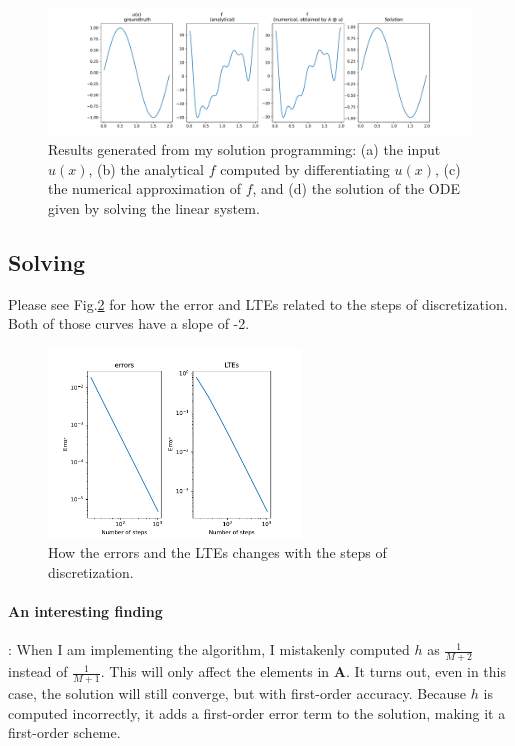 \documentclass[12pt, fullpage,letterpaper]{article}
\begin{document}
\begin{figure}[H]
    \centering
    \includegraphics[width=1\textwidth]{Problem1/solution.pdf}
    \caption{Results generated from my solution programming: (a) the input $u(x)$, (b) the analytical $f$ computed by differentiating $u(x)$, (c) the numerical approximation of $f$, and (d) the solution of the ODE given by solving the linear system. }
    \label{fig:solution}
\end{figure}
\subsection{Solving}
Please see Fig.\ref{fig:error} for how the error and LTEs related to the steps of discretization. Both of those curves have a slope of -2.
\begin{figure}[H]
    \centering
    \includegraphics[width=0.6\textwidth]{Problem1/Error.pdf}
    \caption{How the errors and the LTEs changes with the steps of discretization. }
    \label{fig:error}
\end{figure}

\paragraph{An interesting finding}: When I am implementing the algorithm, I mistakenly computed $h$ as $\frac{1}{M+2}$ instead of  $\frac{1}{M+1}$. This will only affect the elements in $\mathbf{A}$. It turns out, even in this case, the solution will still converge, but with first-order accuracy. Because $h$ is computed incorrectly, it adds a first-order error term to the solution, making it a first-order scheme. 
\end{document}
